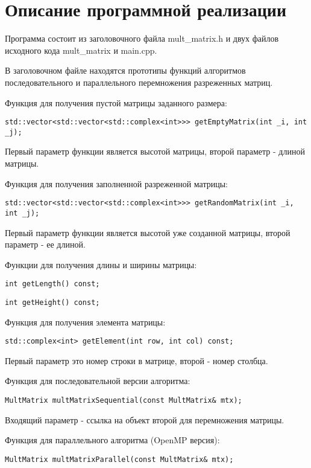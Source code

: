 \documentclass{report}
\begin{document}
\section*{Описание программной реализации}
Программа состоит из заголовочного файла mult_matrix.h и двух файлов исходного кода mult_matrix и main.cpp.
\par В заголовочном файле находятся прототипы функций алгоритмов последовательного и параллельного перемножения разреженных матриц.
\par Функция для получения пустой матрицы заданного размера:
\begin{lstlisting}
std::vector<std::vector<std::complex<int>>> getEmptyMatrix(int _i, int _j);
\end{lstlisting}
Первый параметр функции является высотой матрицы, второй параметр - длиной матрицы.
\par Функция для получения заполненной разреженной матрицы:
\begin{lstlisting}
std::vector<std::vector<std::complex<int>>> getRandomMatrix(int _i, int _j);
\end{lstlisting}
Первый параметр функции является высотой уже созданной матрицы, второй параметр - ее длиной.
\par Функции для получения длины и ширины матрицы:
\begin{lstlisting}
int getLength() const;
\end{lstlisting}
\begin{lstlisting}
int getHeight() const;
\end{lstlisting}
\par Функция для получения элемента матрицы:
\begin{lstlisting}
std::complex<int> getElement(int row, int col) const;
\end{lstlisting}
Первый параметр это номер строки в матрице, второй - номер столбца.
\par Функция для последовательной версии алгоритма:
\begin{lstlisting}
MultMatrix multMatrixSequential(const MultMatrix& mtx);
\end{lstlisting}
Входящий параметр - ссылка на объект второй для перемножения матрицы.
\par Функция для параллельного алгоритма (OpenMP версия):
\begin{lstlisting}
MultMatrix multMatrixParallel(const MultMatrix& mtx);
\end{lstlisting}
\end{document}
